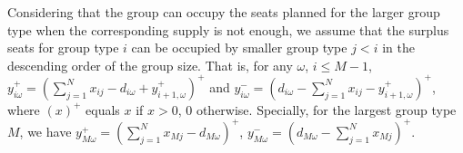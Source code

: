 Considering that the group can occupy the seats planned for the larger group type when the corresponding supply is not enough, we assume that the surplus seats for group type $i$ can be occupied by smaller group type $j<i$ in the descending order of the group size. That is, for any $\omega$, $i \leq M-1$, $y_{i \omega}^{+}=\left(\sum_{j=1}^N x_{ij}- d_{i \omega} + y_{i+1, \omega}^{+}\right)^{+}$ and $y_{i \omega}^{-}=\left(d_{i \omega}- \sum_{j=1}^N x_{ij} - y_{i+1, \omega}^{+} \right)^{+}$, where $(x)^{+}$ equals $x$ if $x>0$, $0$ otherwise. Specially, for the largest group type $M$, we have $y_{M \omega}^{+} = (\sum_{j=1}^N x_{Mj} - d_{M \omega})^{+}$, $y_{M \omega}^{-} = (d_{M \omega}- \sum_{j=1}^N x_{Mj})^{+}$.







